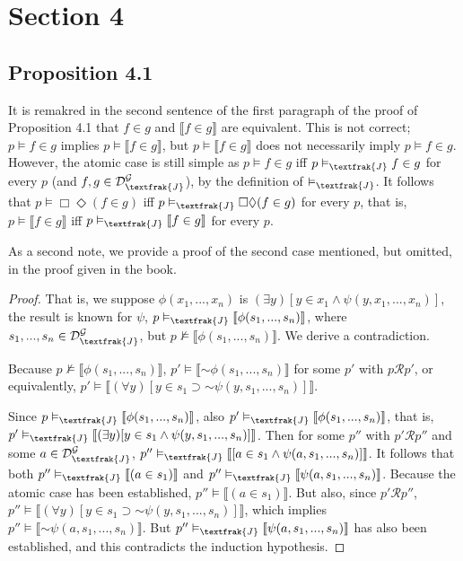 \documentclass{article}
\newcommand*{\oldneg}{\mathord{\sim}}
\newcommand{\lbc}{\llbracket}
\newcommand{\rbc}{\rrbracket}
\theoremstyle{definition}
\begin{document}
\section*{Section 4}

\subsection*{Proposition 4.1}
It is remakred in the second sentence of the first paragraph of the proof of Proposition 4.1 
that $f\in g$ and $\lbc f\in g\rbc$ are equivalent. This is 
not correct; $p\vDash f\in g$ implies $p\vDash\lbc f\in g\rbc$, but $p\vDash\lbc f\in g\rbc$ does not necessarily imply
$p\vDash f\in g$. However, the atomic case is still simple as $p\vDash f\in g$ iff 
$p\vDash_\textfrak{J} f\in g$ for every $p$ (and $f,g\in\mathcal{D}^\mathcal{G}_\textfrak{J}$), by the definition of
$\vDash_\textfrak{J}$. It follows that $p\vDash\Box\Diamond(f\in g)$ iff 
$p\vDash_\textfrak{J}\Box\Diamond(f\in g)$ for every $p$, that is, 
$p\vDash\lbc f\in g\rbc$ iff $p\vDash_\textfrak{J}\lbc f\in g\rbc$ for every $p$.

As a second note, we provide a proof of the second case mentioned, but omitted, in the proof given in the book. 

\begin{proof}
That is, we suppose 
$\phi(x_1,...,x_n)$ is $(\exists y)[y\in x_1\wedge\psi(y,x_1,...,x_n)]$, the result is known for $\psi$, 
$p\vDash_\textfrak{J}\lbc\phi(s_1,...,s_n)\rbc$, where $s_1,...,s_n\in\mathcal{D}^\mathcal{G}_\textfrak{J}$, but 
$p\nvDash\lbc\phi(s_1,...,s_n)\rbc$. We derive a contradiction.

Because $p\nvDash\lbc\phi(s_1,...,s_n)\rbc$, $p'\vDash\lbc\oldneg\phi(s_1,...,s_n)\rbc$ for some 
$p'$ with $p\mathcal{R}p'$, or equivalently,
$p'\vDash\lbc(\forall y)[y\in s_1\supset\oldneg\psi(y,s_1,...,s_n)]\rbc$.

Since $p\vDash_\textfrak{J}\lbc\phi(s_1,...,s_n)\rbc$, also 
$p'\vDash_\textfrak{J}\lbc\phi(s_1,...,s_n)\rbc$, that is, 
$p'\vDash_\textfrak{J}\lbc(\exists y)[y\in s_1\wedge\psi(y,s_1,...,s_n)]\rbc$. Then for some 
$p''$ with $p'\mathcal{R}p''$ and some $a\in\mathcal{D}^\mathcal{G}_\textfrak{J}$,
$p''\vDash_\textfrak{J}\lbc[a\in s_1\wedge\psi(a,s_1,...,s_n)]\rbc$. It follows that both 
$p''\vDash_\textfrak{J}\lbc (a\in s_1)\rbc$ and $p''\vDash_\textfrak{J}\lbc\psi(a,s_1,...,s_n)\rbc$. Because the atomic case has been established, 
$p''\vDash\lbc (a\in s_1)\rbc$. But also, since $p'\mathcal{R}p''$,
$p''\vDash\lbc(\forall y)[y\in s_1\supset\oldneg\psi(y,s_1,...,s_n)]\rbc$, which implies
$p''\vDash\lbc\oldneg\psi(a,s_1,...,s_n)\rbc$. But 
$p''\vDash_\textfrak{J}\lbc\psi(a,s_1,...,s_n)\rbc$ has also been established, and this contradicts the induction
hypothesis.

\end{proof}
\end{document}
